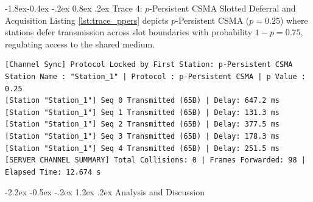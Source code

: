 \documentclass[11pt,a4paper]{article}
\makeatletter
\renewcommand\section{\@startsection {section}{1}{\z@}%
                                   {-2.2ex \@plus -0.5ex \@minus -.2ex}%
                                   {1.2ex \@plus.2ex}%
                                   {\normalfont\Large\bfseries}}
\renewcommand\subsection{\@startsection{subsection}{2}{\z@}%
                                     {-1.8ex\@plus -0.4ex \@minus -.2ex}%
                                     {0.8ex \@plus .2ex}%
                                     {\normalfont\large\bfseries}}
\makeatother
\begin{document}
\subsection{Trace 4: \texorpdfstring{$p$-Persistent}{p-Persistent} CSMA Slotted Deferral and Acquisition}
Listing \ref{lst:trace_ppers} depicts $p$-Persistent CSMA ($p = 0.25$) where stations defer transmission across slot boundaries with probability $1-p = 0.75$, regulating access to the shared medium.

\begin{lstlisting}[style=tracestyle, caption={Live socket execution transcript: $p$-Persistent CSMA ($p=0.25$) slotted arbitration.}, label={lst:trace_ppers}]
[Channel Sync] Protocol Locked by First Station: p-Persistent CSMA
Station Name : "Station_1" | Protocol : p-Persistent CSMA | p Value : 0.25
[Station "Station_1"] Seq 0 Transmitted (65B) | Delay: 647.2 ms
[Station "Station_1"] Seq 1 Transmitted (65B) | Delay: 131.3 ms
[Station "Station_1"] Seq 2 Transmitted (65B) | Delay: 377.5 ms
[Station "Station_1"] Seq 3 Transmitted (65B) | Delay: 178.3 ms
[Station "Station_1"] Seq 4 Transmitted (65B) | Delay: 251.5 ms
[SERVER CHANNEL SUMMARY] Total Collisions: 0 | Frames Forwarded: 98 | Elapsed Time: 12.674 s
\end{lstlisting}

\section{Analysis and Discussion}
\end{document}
